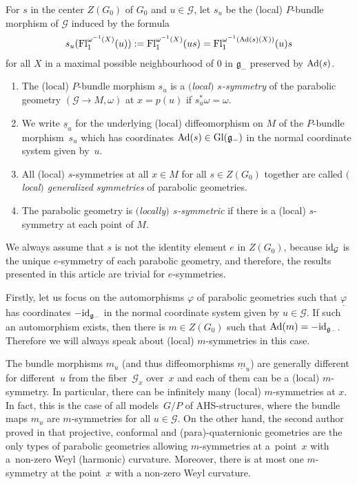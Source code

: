 \documentclass[pdftex]{sigma}
\newcommand{\om}{\omega}
\newcommand{\un}{\underline}
\newcommand{\ba}{\mathcal{G}}
\newcommand{\fg}{\mathfrak g}
\newcommand{\Ad}{{\rm Ad}}
\newcommand{\Fl}{{\rm Fl}}
\newcommand{\id}{{\rm id}}
\numberwithin{equation}{section}
\begin{document}
\begin{Definition} \label{def3}
For $s$ in the center $Z(G_0)$ of $G_0$ and $u\in \ba$, let $s_u$ be the (local) $P$-bundle morphism of $\ba$ induced by the formula
\begin{gather*}s_u(\Fl_1^{\om^{-1}(X)}(u)):=\Fl_1^{\om^{-1}(X)}(us)=\Fl_1^{\om^{-1}(\Ad(s) (X))}(u)s\end{gather*}
for all $X$ in a maximal possible neighbourhood of $0$ in $\fg_-$ preserved by $\Ad(s)$.
\begin{enumerate}\itemsep=0pt
\item The (local) $P$-bundle morphism $s_u$ is a \emph{$($local$)$ $s$-symmetry} of the parabolic geometry $(\ba\to M,\om)$ at $x=p(u)$ if $s_u^*\om=\om$.
\item We write $\un s_u$ for the underlying (local) dif\/feomorphism on $M$ of the $P$-bundle mor\-phism~$s_u$ which has coordinates $\Ad(s)\in {\rm Gl}(\fg_-)$ in the normal coordinate system given by~$u$.
\item All (local) $s$-symmetries at all $x\in M$ for all $s\in Z(G_0)$ together are called \emph{$($local$)$ gene\-ra\-li\-zed symmetries} of parabolic geometries.
\item The parabolic geometry is \emph{$($locally$)$ $s$-symmetric} if there is a (local) $s$-symmetry at each point of $M$.
\end{enumerate}
\end{Definition}
\begin{Remark}
We always assume that $s$ is not the identity element $e$ in $Z(G_0)$, because $\id_\ba$ is the unique $e$-symmetry of each parabolic geometry, and therefore, the results presented in this article are trivial for $e$-symmetries.
\end{Remark}

Firstly, let us focus on the automorphisms $\varphi$ of parabolic geometries such that $\un{\varphi}$ has coordinates $-\id_{\fg_-}$ in the normal coordinate system given by $u\in \ba$. If such an automorphism exists, then there is $m\in Z(G_0)$ such that $\Ad(m)=-\id_{\fg_-}$. Therefore we will always speak about (local) $m$-symmetries in this case.

The bundle morphisms $m_u$ (and thus dif\/feomorphisms $\underline{m}_u$) are generally dif\/ferent for dif\/fe\-rent~$u$ from the f\/iber~$\ba_x$ over~$x$ and each of them can be a (local) $m$-symmetry. In particular, there can be inf\/initely many (local) $m$-symmetries at $x$. In fact, this is the case of all mo\-dels~$G/P$ of AHS-structures, where the bundle maps $m_u$ are $m$-symmetries for all $u\in \ba$. On the other hand, the second author proved in \cite[Theorem 2.5]{LZ1} that projective, conformal and (para)-quaternionic geometries are the only types of parabolic geometries allowing $m$-symmetries at a~point~$x$ with a~non-zero Weyl (harmonic) curvature. Moreover, there is at most one $m$-symmetry at the point~$x$ with a non-zero Weyl curvature.
\end{document}
